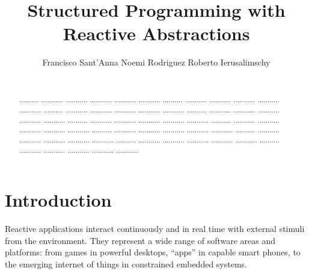 \documentclass{acm_proc_article-sp}
\newcommand{\1}{\;}
\newcommand{\2}{\;\;}
\newcommand{\3}{\;\;\;}
\newcommand{\5}{\;\;\;\;\;}
\begin{document}
\title {
    Structured Programming with Reactive Abstractions
}

\author{
    \alignauthor
    Francisco Sant'Anna \hspace{1cm} Noemi Rodriguez \hspace{1cm} Roberto Ierusalimschy   \\
     \\
}

\maketitle

\begin{abstract}
.......... ........... ........... ........... ........... ...........
.......... ........... ........... ........... ........... ...........
.......... ........... ........... ........... ........... ...........
.......... ........... ........... ........... ........... ...........
.......... ........... ........... ........... ........... ...........
.......... ........... ........... ........... ........... ...........
.......... ........... ........... ........... ........... ...........
.......... ........... ........... ........... ........... ...........
.......... ........... ........... ........... ........... ...........
.......... ........... ........... ........... ........... ...........
\end{abstract}




\section{Introduction}
\label{sec.intro}

Reactive applications interact continuously and in real time with external 
stimuli from the environment.
They represent a wide range of software areas and platforms: from games in 
powerful desktops, ``apps'' in capable smart phones, to the emerging internet 
of things in constrained embedded systems.
\end{document}
